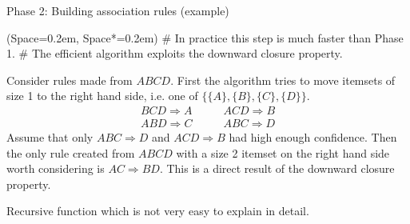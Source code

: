 \documentclass[12pt, aspectratio=1610]{beamer}
\newcommand{\listSpace}{0.2em}
\theoremstyle{plain}
\begin{document}
\begin{frame}[fragile]{Phase 2: Building association rules (example)}
	\begin{easylist}[itemize]
		\ListProperties(Space=\listSpace, Space*=\listSpace)
		# In practice this step is much faster than Phase 1.
		# The efficient algorithm exploits the downward closure property. 
	\end{easylist}
	\begin{Example}
		Consider rules made from $ABCD$.
		First the algorithm tries to move itemsets of size 1 to the right hand side, i.e. one of $\{\{ A\}, \{ B\}, \{ C\}, \{ D\} \}$.
		\begin{align*}
			BCD  \Rightarrow A \quad & \quad
			ACD  \Rightarrow B \\
			ABD  \Rightarrow C \quad & \quad
			ABC  \Rightarrow D 
		\end{align*}
		Assume that only $ABC \Rightarrow D$ and $ACD \Rightarrow B$ had high enough confidence. Then the only rule created from $ABCD$ with a size 2 itemset on the right hand side worth considering is $AC \Rightarrow BD$.
		This is a direct result of the downward closure property.
	\end{Example}
	
	Recursive function which is not very easy to explain in detail.
\end{frame}
\end{document}
